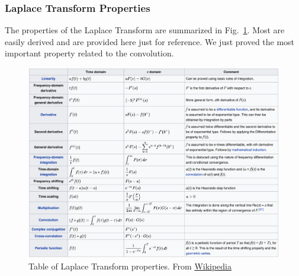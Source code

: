 \subsubsection{Laplace Transform Properties}
The properties of the Laplace Transform are summarized in Fig.~\ref{fig:laplace_table}.   Most are easily derived and are provided here just for reference.  We just proved the most important property related to the convolution.    
\begin{figure}[tb]
\centering
\includegraphics[width=.9\columnwidth]{laplace_table.png}
\caption{Table of Laplace Transform properties.  From \href{https://en.Wikipedia.org/wiki/Laplace_transform}{Wikipedia}}
\label{fig:laplace_table}
\end{figure}

